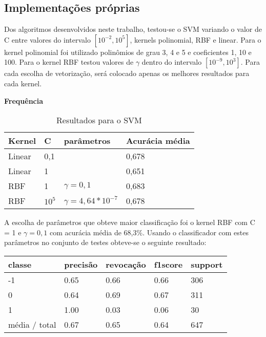 \subsection{Implementações próprias}

Dos algoritmos desenvolvidos neste trabalho, testou-se o SVM variando o valor de C entre valores
do intervalo $[10^{-2}, 10^5]$, kernels polinomial, RBF e linear. Para o kernel polinomial foi utilizado
polinômios de grau 3, 4 e 5 e coeficientes 1, 10 e 100. Para o kernel RBF testou valores de $\gamma$
dentro do intervalo $[10^{-9}, 10^3]$. Para cada escolha de vetorização, será colocado apenas os
melhores resultados para cada kernel.

\textbf{Frequência}

\begin{table}[H]
	\centering
	\caption{Resultados para o SVM}
	\begin{tabular}{l l l l}
		\hline
		Kernel & C & parâmetros & Acurácia média \\
		\hline
		Linear & 0,1 & & 0,678 \\
		\hline
		Linear & 1 & & 0,651 \\
		\hline
		RBF & 1 & $\gamma = 0,1$ & 0,683 \\
		\hline
		RBF & $10^5$ & $\gamma = 4,64*10^{-7}$ & 0,678 \\
		\hline
	\end{tabular}
\end{table}

A escolha de parâmetros que obteve maior classificação foi o kernel RBF com C = 1 e $\gamma = 0,1$
com acurácia média de 68,3\%. Usando o classificador com estes parâmetros no conjunto de testes
obteve-se o seguinte resultado:

\begin{table}[H]
	\centering
	\begin{tabular}{l | l | l | l | l}
		\hline
		classe  	&	precisão  &  revocação &  f1\-score &  support \\
		\hline
         -1   &    0.65  &    0.66   &   0.66   &    306 \\
         \hline
          0   &    0.64   &   0.69   &   0.67    &   311 \\
          \hline
          1   &    1.00   &   0.03   &   0.06    &    30 \\
		\hline
		média / total   &    0.67   &   0.65   &   0.64   &    647 \\
		\hline
	\end{tabular}
\end{table}

